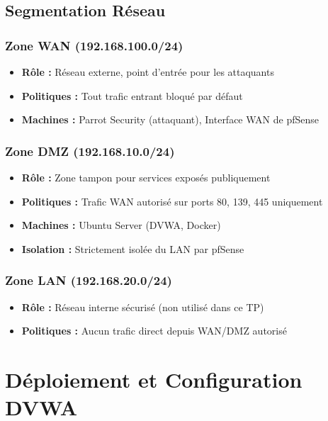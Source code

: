 \documentclass[12pt,a4paper,openany]{report}
\begin{document}
	\section{Segmentation Réseau}
	
	\subsection{Zone WAN (192.168.100.0/24)}
	\begin{itemize}
		\item \textbf{Rôle :} Réseau externe, point d'entrée pour les attaquants
		\item \textbf{Politiques :} Tout trafic entrant bloqué par défaut
		\item \textbf{Machines :} Parrot Security (attaquant), Interface WAN de pfSense
	\end{itemize}
	
	\subsection{Zone DMZ (192.168.10.0/24)}
	\begin{itemize}
		\item \textbf{Rôle :} Zone tampon pour services exposés publiquement
		\item \textbf{Politiques :} Trafic WAN autorisé sur ports 80, 139, 445 uniquement
		\item \textbf{Machines :} Ubuntu Server (DVWA, Docker)
		\item \textbf{Isolation :} Strictement isolée du LAN par pfSense
	\end{itemize}
	
	\subsection{Zone LAN (192.168.20.0/24)}
	\begin{itemize}
		\item \textbf{Rôle :} Réseau interne sécurisé (non utilisé dans ce TP)
		\item \textbf{Politiques :} Aucun trafic direct depuis WAN/DMZ autorisé
	\end{itemize}
	
	
	\chapter{Déploiement et Configuration DVWA}
	
\end{document}
